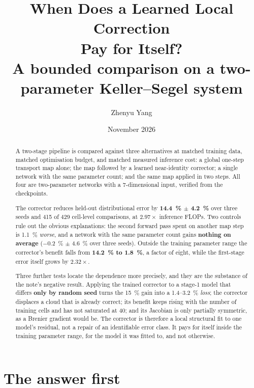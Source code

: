 ﻿\documentclass[11pt,a4paper]{article}
\title{\vspace{-1.4cm}\bfseries When Does a Learned Local Correction\\ Pay for Itself?\\[0.4em]
\large A bounded comparison on a two-parameter Keller--Segel system}
\author{Zhenyu Yang}
\date{November 2026}
\begin{document}
\maketitle
\vspace{-0.4cm}

\begin{abstract}
\noindent
A two-stage pipeline is compared against three alternatives at matched training data, matched
optimisation budget, and matched measured inference cost: a global one-step transport map alone;
the map followed by a learned near-identity corrector; a single network with the same parameter
count; and the same map applied in two steps. All four are two-parameter networks with a
7-dimensional input, verified from the checkpoints.

The corrector reduces held-out distributional error by \textbf{\SI{14.4}{\percent}$\,\pm\,$\SI{4.2}{\percent}}
over three seeds and 415 of 429 cell-level comparisons, at \textbf{$2.97\times$} inference FLOPs.
Two controls rule out the obvious explanations: the second forward pass spent on another map
step is \SI{1.1}{\percent} \emph{worse}, and a network with the same parameter count gains
\textbf{nothing on average} (\SI{-0.2}{\percent} $\pm$ \SI{4.6}{\percent} over three seeds). Outside
the training parameter range the corrector's benefit falls from \textbf{\SI{14.2}{\percent} to
\SI{1.8}{\percent}}, a factor of eight, while the first-stage error itself grows by $2.32\times$.

Three further tests locate the dependence more precisely, and they are the substance of the note's
negative result. Applying the trained corrector to a stage-1 model that differs \textbf{only by
random seed} turns the \SI{15}{\percent} gain into a \SI{1.4}{}--\SI{3.2}{\percent} \emph{loss}; the
corrector displaces a cloud that is already correct; its benefit keeps rising with the number of
training cells and has not saturated at 40; and its Jacobian is only partially symmetric, as a
Brenier gradient would be. The corrector is therefore a local structural fit to one model's
residual, not a repair of an identifiable error class. It pays for itself inside the training
parameter range, for the model it was fitted to, and not otherwise.
\end{abstract}

\vspace{0.3cm}

\section{The answer first}
\end{document}
